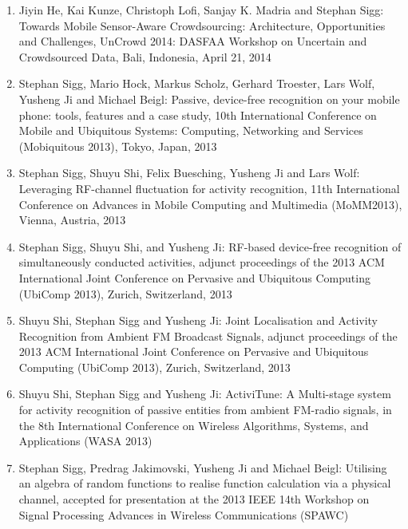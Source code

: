 \documentclass[10pt]{article}
\newcounter{saveenumi}
\begin{document}
\begin{enumerate}
\setcounter{enumi}{\value{saveenumi}}
\item Jiyin He, Kai Kunze, Christoph Lofi, Sanjay K. Madria and Stephan Sigg: Towards Mobile Sensor-Aware Crowdsourcing: Architecture, Opportunities and Challenges, UnCrowd 2014: DASFAA Workshop on Uncertain and Crowdsourced Data, Bali, Indonesia, April 21, 2014
\item Stephan Sigg, Mario Hock, Markus Scholz, Gerhard Troester, Lars Wolf, Yusheng Ji and Michael Beigl: Passive, device-free recognition on your mobile phone: tools, features and a case study, 10th International Conference on Mobile and Ubiquitous Systems: Computing, Networking and Services (Mobiquitous 2013), Tokyo, Japan, 2013
\item Stephan Sigg, Shuyu Shi, Felix Buesching, Yusheng Ji and Lars Wolf: Leveraging RF-channel fluctuation for activity recognition, 11th International Conference on Advances in Mobile Computing and Multimedia (MoMM2013), Vienna, Austria, 2013
\item Stephan Sigg, Shuyu Shi, and Yusheng Ji: RF-based device-free recognition of simultaneously conducted activities, adjunct proceedings of the 2013 ACM International Joint Conference on Pervasive and Ubiquitous Computing (UbiComp 2013), Zurich, Switzerland, 2013
\item Shuyu Shi, Stephan Sigg and Yusheng Ji: Joint Localisation and Activity Recognition from Ambient FM Broadcast Signals, adjunct proceedings of the 2013 ACM International Joint Conference on Pervasive and Ubiquitous Computing (UbiComp 2013), Zurich, Switzerland, 2013
\item Shuyu Shi, Stephan Sigg and Yusheng Ji: ActiviTune: A Multi-stage system for activity recognition of passive entities from ambient FM-radio signals, in the 8th International Conference on Wireless Algorithms, Systems, and Applications (WASA 2013)
\item Stephan Sigg, Predrag Jakimovski, Yusheng Ji and Michael Beigl: Utilising an algebra of random functions to realise function calculation via a physical channel, accepted for presentation at the 2013 IEEE 14th Workshop on Signal Processing Advances in Wireless Communications (SPAWC)

\end{enumerate}
\end{document}
